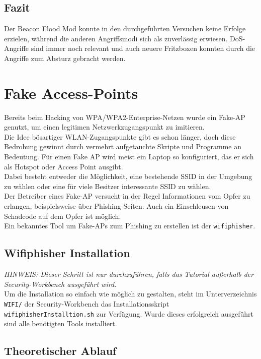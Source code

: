 \subsection{Fazit}

Der Beacon Flood Mod konnte in den durchgeführten Versuchen keine Erfolge erzielen, während die anderen Angriffsmodi sich als zuverlässig erwiesen. DoS-Angriffe sind immer noch relevant und auch neuere Fritzboxen konnten durch die Angriffe zum Absturz gebracht werden.
\newpage

\section{Fake Access-Points}
Bereits beim Hacking von WPA/WPA2-Enterprise-Netzen wurde ein Fake-AP genutzt, um einen legitimen Netzwerkzugangspunkt zu imitieren.\\ Die Idee bösartiger WLAN-Zugangspunkte gibt es schon länger, doch diese Bedrohung gewinnt durch vermehrt aufgetauchte Skripte und Programme an Bedeutung. Für einen Fake AP wird meist ein Laptop so konfiguriert, das er sich als Hotspot oder Access Point ausgibt.\\ Dabei besteht entweder die Möglichkeit, eine bestehende SSID in der Umgebung zu wählen oder eine für viele Besitzer interessante SSID zu wählen. \\
Der Betreiber eines Fake-AP versucht in der Regel Informationen vom Opfer zu erlangen, beispielsweise über Phishing-Seiten. Auch ein Einschleusen von Schadcode auf dem Opfer ist möglich. \\
Ein bekanntes Tool um Fake-APs zum Phishing zu erstellen ist der \colorbox{altgray}{\lstinline|wifiphisher|}.

\subsection{Wifiphisher Installation}
\textit{HINWEIS: Dieser Schritt ist nur durchzuführen, falls das Tutorial außerhalb der Security-Workbench ausgeführt wird.}\\
Um die Installation so einfach wie möglich zu gestalten, steht im Unterverzeichnis \colorbox{altgray}{\lstinline|WIFI/|} der Security-Workbench das Installationsskript \colorbox{altgray}{\lstinline|wifiphisherInstalltion.sh|} zur Verfügung. Wurde dieses erfolgreich ausgeführt sind alle benötigten Tools installiert.

\subsection{Theoretischer Ablauf}

